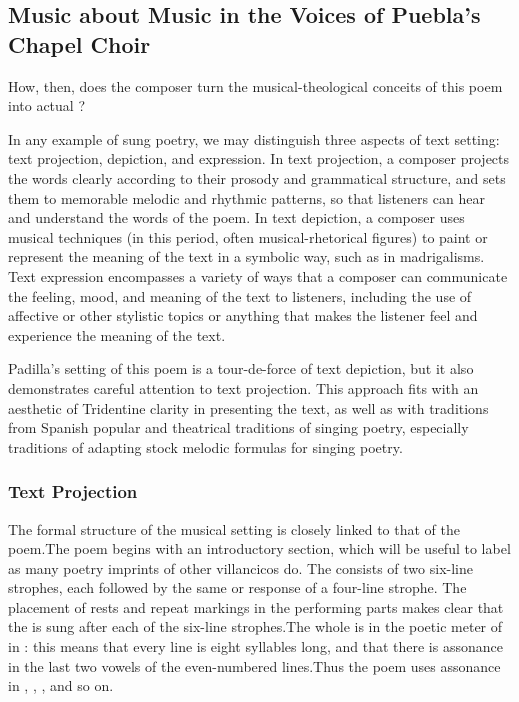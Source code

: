 \subsection{Music about Music in the Voices of Puebla's Chapel Choir}

How, then, does the composer turn the musical-theological conceits of this poem
into actual ?

In any example of sung poetry, we may distinguish three aspects of text setting:
text projection, depiction, and expression.%
In text projection, a composer projects the words clearly according to their
prosody and grammatical structure, and sets them to memorable melodic and
rhythmic patterns, so that listeners can hear and understand the words of the
poem.
In text depiction, a composer uses musical techniques (in this period, often
musical-rhetorical figures) to paint or represent the meaning of the text in a
symbolic way, such as in madrigalisms.
Text expression encompasses a variety of ways that a composer can communicate
the feeling, mood, and meaning of the text to listeners, including the use of
affective or other stylistic topics or anything that makes the listener feel and
experience the meaning of the text.

Padilla's setting of this poem is a tour-de-force of text depiction, but it
also demonstrates careful attention to text projection.
This approach fits with an aesthetic of Tridentine clarity in presenting the
text, as well as with traditions from Spanish popular and theatrical traditions
of singing poetry, especially traditions of adapting stock melodic formulas for
singing  poetry.\citXXX{}

\subsubsection{Text Projection}

The formal structure of the musical setting is closely linked to that of the
poem.\citXXX[my edition]
The poem begins with an introductory section, which will be useful to label
 as many poetry imprints of other villancicos do.
The  consists of two six-line strophes, each followed by the
same  or response of a four-line strophe.
The placement of rests and repeat markings in the performing parts makes clear
that the  is sung after each of the six-line
strophes.
The whole  is in the poetic meter of  in
: this means that every line is eight syllables long, and that there
is assonance in the last two vowels of the even-numbered lines.\citXXX[metrica]
Thus the poem uses  assonance in ,
, , and so on.


